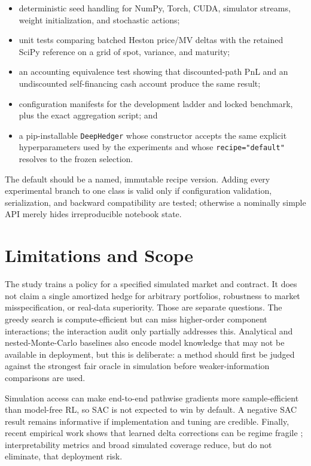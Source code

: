 \documentclass[sigconf,balance=false]{acmart}
\begin{document}
\begin{itemize}
  \item deterministic seed handling for NumPy, Torch, CUDA, simulator streams,
  weight initialization, and stochastic actions;
  \item unit tests comparing batched Heston price/MV deltas with the retained
  SciPy reference on a grid of spot, variance, and maturity;
  \item an accounting equivalence test showing that discounted-path PnL and an
  undiscounted self-financing cash account produce the same result;
  \item configuration manifests for the development ladder and locked
  benchmark, plus the exact aggregation script; and
  \item a pip-installable \texttt{DeepHedger} whose constructor accepts the
  same explicit hyperparameters used by the experiments and whose
  \texttt{recipe="default"} resolves to the frozen selection.
\end{itemize}

The default should be a named, immutable recipe version.  Adding every
experimental branch to one class is valid only if configuration validation,
serialization, and backward compatibility are tested; otherwise a nominally
simple API merely hides irreproducible notebook state.

\section{Limitations and Scope}

The study trains a policy for a specified simulated market and contract.  It
does not claim a single amortized hedge for arbitrary portfolios, robustness to
market misspecification, or real-data superiority.  Those are separate
questions.  The greedy search is compute-efficient but can miss higher-order
component interactions; the interaction audit only partially addresses this.
Analytical and nested-Monte-Carlo baselines also encode model knowledge that
may not be available in deployment, but this is deliberate: a method should
first be judged against the strongest fair oracle in simulation before
weaker-information comparisons are used.

Simulation access can make end-to-end pathwise gradients more sample-efficient
than model-free RL, so SAC is not expected to win by default.  A negative SAC
result remains informative if implementation and tuning are credible.  Finally,
recent empirical work shows that learned delta corrections can be regime
fragile \cite{zernikov2026what}; interpretability metrics and broad simulated
coverage reduce, but do not eliminate, that deployment risk.
\end{document}
